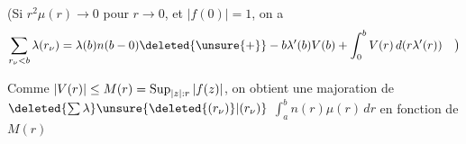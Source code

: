 (Si $r^2\mu(r)\to0$ pour $r\to0$, et $|f(0)|=1$, on a
\[
\sum_{r_\nu<b}\lambda(r_\nu)=\lambda(b)n(b-0)\deleted{\unsure{+}}-b\lambda'(b)V(b)+\int_0^b V(r)\,d(r\lambda'(r))\quad\big)
\]

Comme $|V(r)|\leq M(r)=\mathop{\rm Sup}_{|z|:r}|f(z)|$, on obtient une
majoration de $\deleted{\sum\lambda}\unsure{\deleted{(r_\nu)}|(r_\nu)}$ $\int_a^b n(r)\mu(r)\,dr$ en fonction
de $M(r)$
